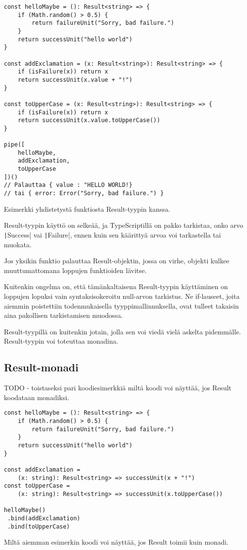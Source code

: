 \begin{code}
    \begin{verbatim}
const helloMaybe = (): Result<string> => {
    if (Math.random() > 0.5) {
        return failureUnit("Sorry, bad failure.")
    }
    return successUnit("hello world")
}

const addExclamation = (x: Result<string>): Result<string> => {
    if (isFailure(x)) return x
    return successUnit(x.value + "!")
}

const toUpperCase = (x: Result<string>): Result<string> => {
    if (isFailure(x)) return x
    return successUnit(x.value.toUpperCase())
}

pipe([
    helloMaybe,
    addExclamation,
    toUpperCase
])()
// Palauttaa { value : "HELLO WORLD!}
// tai { error: Error("Sorry, bad failure.") }
    \end{verbatim}
    \caption{Esimerkki yhdistetystä funktiosta Result-tyypin kanssa.}
    \label{code:result_pipe_example}
\end{code}

Result-tyypin käyttö on selkeää, ja TypeScriptillä on pakko tarkistaa, onko arvo \texttt|Success| vai \texttt|Failure|, ennen kuin sen käärittyä arvoa voi tarkastella tai muokata.

Jos yksikin funktio palauttaa Result-objektin, jossa on virhe, objekti kulkee muuttumattomana loppujen funktioiden lävitse.

Kuitenkin ongelma on, että tämänkaltaisena Result-tyypin käyttäminen on loppujen lopuksi vain syntaksisokeroitu null-arvon tarkistus. Ne if-lauseet, joita aiemmin poistettiin todenmukaisella tyyppimallinnuksella, ovat tulleet takaisin aina pakollisen tarkistamisen muodossa.

Result-tyypillä on kuitenkin jotain, jolla sen voi viedä vielä askelta pidemmälle. Result-tyypin voi toteuttaa monadina.


\subsection{Result-monadi}

TODO - toistaseksi pari koodiesimerkkiä miltä koodi voi näyttää, jos Result koodataan monadiksi.

\begin{code}
    \begin{verbatim}
const helloMaybe = (): Result<string> => {
    if (Math.random() > 0.5) {
        return failureUnit("Sorry, bad failure.")
    }
    return successUnit("hello world")
}

const addExclamation = 
    (x: string): Result<string> => successUnit(x + "!")
const toUpperCase = 
    (x: string): Result<string> => successUnit(x.toUpperCase())

helloMaybe()
 .bind(addExclamation)
 .bind(toUpperCase)
\end{verbatim}
    \caption{Miltä aiemman esimerkin koodi voi näyttää, jos Result toimii kuin monadi.}
    \label{code:result_monad_example}
\end{code}

